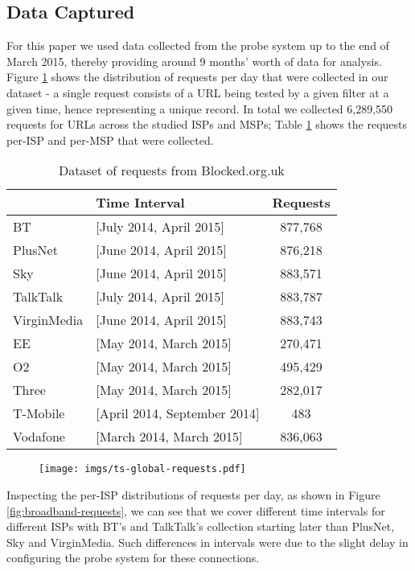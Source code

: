 \documentclass{bmcart}
\begin{document}
\subsection*{Data Captured}
For this paper we used data collected from the probe system up to the end of March 2015, thereby providing around 9 months' worth of data for analysis.
Figure \ref{fig:total-requests} shows the distribution of requests per day that were collected in our dataset - a single request consists of a URL being tested by a given filter at a given time, hence representing a unique record.
In total we collected 6,289,550 requests for URLs across the studied ISPs and MSPs; Table \ref{tab:dataset_summary} shows the requests per-ISP and per-MSP that were collected.


\begin{table}[h!]
\caption{Dataset of requests from Blocked.org.uk}
  \begin{tabular}{ l l c}
    \hline
     & Time Interval & Requests \\
    \hline
	BT & [July 2014, April 2015] & 877,768 \\
	PlusNet & [June 2014, April 2015]  & 876,218 \\
    Sky & [June 2014, April 2015] & 883,571 \\
    TalkTalk & [July 2014, April 2015] & 883,787 \\
	VirginMedia & [June 2014, April 2015] & 883,743 \\
	\hline    
	EE & [May 2014, March 2015] & 270,471 \\
	O2 & [May 2014, March 2015] & 495,429 \\
	Three & [May 2014, March 2015] & 282,017 \\
	T-Mobile & [April 2014, September 2014] & 483 \\
	Vodafone & [March 2014, March 2015] & 836,063 \\
    \hline
  \end{tabular}
  \label{tab:dataset_summary}
\end{table}

\begin{figure}[t]
\caption{}
\texttt{[image: imgs/ts-global-requests.pdf]}
\label{fig:total-requests}
\end{figure}

Inspecting the per-ISP distributions of requests per day, as shown in Figure \ref{fig:broadband-requests}, we can see that we cover different time intervals for different ISPs with BT's and TalkTalk's collection starting later than PlusNet, Sky and VirginMedia.
Such differences in intervals were due to the slight delay in configuring the probe system for these connections. 
\end{document}
